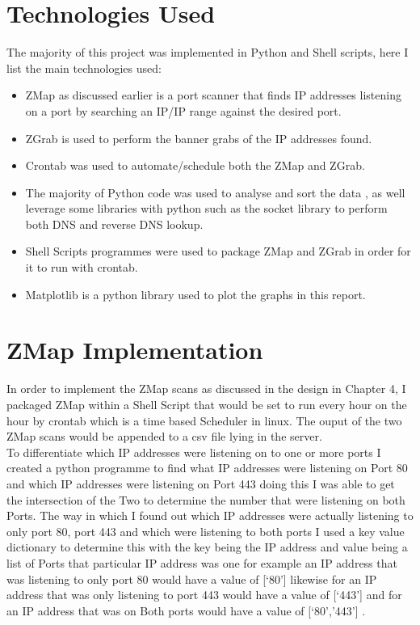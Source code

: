 \documentclass[a4wide,leqno,12pt]{report}
\begin{document}
\section{Technologies Used}
The majority of this project was implemented in Python and Shell scripts, here I list the main technologies used:
\begin{itemize}
  \item ZMap as discussed earlier is a port scanner that finds IP addresses listening on a port by searching an IP/IP range against the desired port.
  \item ZGrab is used to perform the banner grabs of the IP addresses found.
  \item Crontab was used to automate/schedule both the ZMap and ZGrab.
  \item The majority of Python code was used to analyse and sort the data , as well leverage some libraries with python such as the socket library \cite{socket} to perform both DNS and reverse DNS lookup.
  \item Shell Scripts programmes were used to package ZMap and ZGrab in order for it to run with crontab.
  \item Matplotlib \cite{matplotlib} is a python library used to plot the graphs in this report.
\end{itemize}

\section{ZMap Implementation}
In order to implement the ZMap scans as discussed in the design in Chapter 4, I packaged ZMap within a Shell Script that would be set to run every hour on the hour by crontab which is a time based Scheduler in linux. The ouput of the two ZMap scans would be appended to a csv file lying in the server.\\

To differentiate which IP addresses were listening on to one or more ports I created a python programme to find what IP addresses were listening on Port 80 and which IP addresses were listening on Port 443 doing this I was able to get the intersection of the Two to determine the number that were listening on both Ports. The way in which I found out which IP addresses were actually listening to only port 80, port 443 and which were listening to both ports I used a key value dictionary to determine this with the key being the IP address and value being a list of Ports that particular IP address was one for example an IP address that was listening to only port 80 would have a value of [‘80’] likewise for an IP address that was only listening to port 443 would have a value of [‘443’] and for an IP address that was on Both ports would have a value of [‘80’,’443’] .
\end{document}

